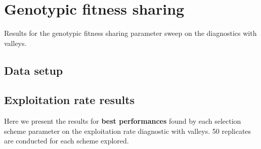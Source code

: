 \documentclass[]{book}
\newenvironment{Shaded}{\begin{snugshade}}{\end{snugshade}}
\newcommand{\DataTypeTok}[1]{\textcolor[rgb]{0.13,0.29,0.53}{#1}}
\newcommand{\KeywordTok}[1]{\textcolor[rgb]{0.13,0.29,0.53}{\textbf{#1}}}
\newcommand{\NormalTok}[1]{#1}
\newcommand{\OperatorTok}[1]{\textcolor[rgb]{0.81,0.36,0.00}{\textbf{#1}}}
\newcommand{\OtherTok}[1]{\textcolor[rgb]{0.56,0.35,0.01}{#1}}
\newcommand{\StringTok}[1]{\textcolor[rgb]{0.31,0.60,0.02}{#1}}
\begin{document}
\hypertarget{genotypic-fitness-sharing}{%
\chapter{Genotypic fitness sharing}\label{genotypic-fitness-sharing}}

Results for the genotypic fitness sharing parameter sweep on the diagnostics with valleys.

\hypertarget{data-setup-2}{%
\section{Data setup}\label{data-setup-2}}

\begin{Shaded}
\end{Shaded}

\hypertarget{exploitation-rate-results-2}{%
\section{Exploitation rate results}\label{exploitation-rate-results-2}}

Here we present the results for \textbf{best performances} found by each selection scheme parameter on the exploitation rate diagnostic with valleys.
50 replicates are conducted for each scheme explored.
\end{document}
